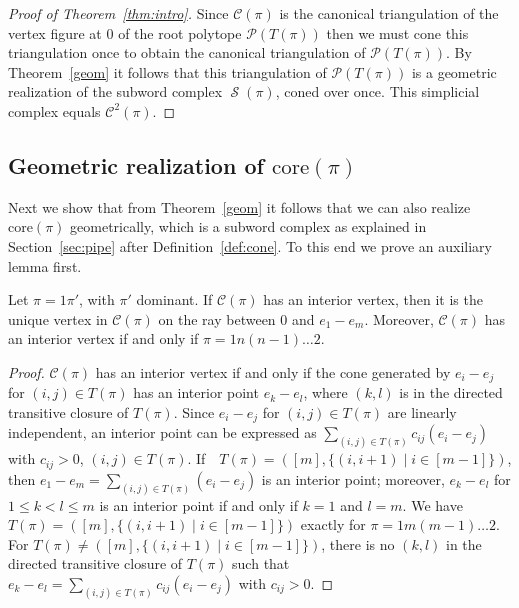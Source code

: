 \documentclass[ALCO,ThmDefs]{cedram}
\numberwithin{equation}{section}
\newcommand*\C{{\mathcal{C}}}
\renewcommand*\P{{\mathcal{P}}}
\newcommand*\+{\smash{\lower2pt\hbox{\rlap{\vrule height14pt}}\raise2pt\hbox{\rlap{\hskip-3pt \vrule height.4pt depth0pt width14.7pt}}}}
\DeclareMathOperator{\Scal}{\mathcal{S}}
\begin{document}
\begin{proof}[Proof of Theorem~\ref{thm:intro}]
Since $\C(\pi)$ is the canonical triangulation of the vertex figure at $0$ of the root polytope $\P(T(\pi))$ then we must cone this triangulation once to obtain the canonical triangulation of $\P(T(\pi))$. By Theorem~\ref{geom} it follows that this triangulation of $\P(T(\pi))$ is a geometric realization of the subword complex $\Scal(\pi)$, coned over once. This simplicial complex equals $\mathcal{C}^2(\pi)$.
\end{proof}


\subsection{Geometric realization of \texorpdfstring{$\text{core}(\pi)$}{core(pi)}}

Next we show that from Theorem~\ref{geom} it follows that we can also realize $\text{core}(\pi)$ geometrically, which is a subword complex as explained in Section~\ref{sec:pipe} after Definition~\ref{def:cone}. To this end we prove an auxiliary lemma first.

\begin{lemm}\label{int}
Let $\pi=1\pi'$, with $\pi'$ dominant. If $\C(\pi)$ has an interior vertex, then it is the unique vertex in $\C(\pi)$ on the ray between $0$ and $e_1-e_m$. Moreover, $\C(\pi)$ has an interior vertex if and only if $\pi=1n(n-1)\dots 2$.
\end{lemm}

\begin{proof} $\C(\pi)$ has an interior vertex if and only if the cone generated by $e_i-e_j$ for $(i,j)\in T(\pi)$ has an interior point $e_k-e_l$, where $(k,l)$ is in the directed transitive closure of $T(\pi)$. Since $e_i-e_j$ for $(i,j)\in T(\pi)$ are linearly independent, an interior point can be expressed as $\sum_{(i,j)\in T(\pi)} c_{ij} (e_i-e_j)$ with $c_{ij}>0$, $(i,j)\in T(\pi)$. If $\mbox{ } T(\pi)=([m], \{(i,i+1) \mid i \in [m-1]\})$, then $e_1-e_m=\sum_{(i,j)\in T(\pi)} (e_i-e_j)$ is an interior point; moreover, $e_k-e_l$ for $1\leq k<l\leq m$ is an interior point if and only if $k=1$ and $l=m$. We have $T(\pi)=([m], \{(i,i+1) \mid i \in [m-1]\})$ exactly for $\pi=1 m (m-1)\dots 2$. For $T(\pi)\neq ([m], \{(i,i+1) \mid i \in [m-1]\})$, there is no $(k,l)$ in the directed transitive closure of $T(\pi)$ such that $e_k-e_l=\sum_{(i,j)\in T(\pi)} c_{ij} (e_i-e_j)$ with $c_{ij}>0$.
\end{proof}
\end{document}
